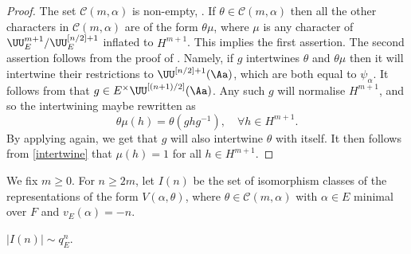 \begin{proof} The set $\mathcal C(m, \alpha)$ is non-empty, \cite[(3.3.18)]{BK}. If $\theta\in \mathcal C(m, \alpha)$ then all the other characters
in $\mathcal C(m, \alpha)$ are of the form $\theta \mu$, where $\mu$ is any character of $\UU^{m+1}_E/ \UU^{[n/2]+1}_E$ inflated to $H^{m+1}$.
This implies the first assertion. The second assertion follows from the proof of \cite[Prop.\,7.3]{thesis}.
Namely, if $g$ intertwines $\theta$ and $\theta \mu$ then it will intertwine their restrictions to $\UU^{[n/2]+1}(\Aa)$, which are both equal to
$\psi_{\alpha}$. It follows from \cite[(3.3.2)]{BK} that $g\in E^{\times} \UU^{[(n+1)/2]}(\Aa)$. Any such $g$ will normalise $H^{m+1}$, and so
the intertwining maybe rewritten as
\begin{equation}\label{intertwine}
\theta\mu(h)= \theta(g h g^{-1}), \quad \forall h \in H^{m+1}.
\end{equation}
By applying \cite[(3.3.2)]{BK} again, we get that $g$ will also intertwine $\theta$ with itself. It then follows from \eqref{intertwine} that $\mu(h)=1$
for all $h\in H^{m+1}$.
\end{proof}

We fix $m\ge 0$. For $n\ge 2m$, let $I(n)$ be the set of isomorphism classes of the representations of the form $V(\alpha, \theta)$, where
$\theta\in \mathcal C(m, \alpha)$ with $\alpha\in E$ minimal over $F$ and $v_E(\alpha)=-n$.

\begin{prop}\label{size_I(n)} $|I(n)|\sim q_E^{n}$.
\end{prop}

